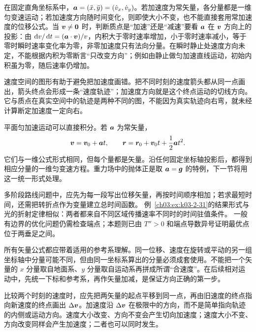 {在固定直角坐标系中，$\bm{a}=(\ddot x,\ddot y)=(\dot v_x,\dot v_y)$。若加速度为常矢量，各分量都是一维匀变速运动；若加速度方向随时间变化，则即使大小不变，也不能直接套用常加速度的位移公式。当 $\bm{v}\ne\bm{0}$ 时，判断质点是“加速”还是“减速”要看 $\bm{a}$ 在 $\bm{v}$ 方向上的投影：由 $\mathop{}\!\mathrm d v/\mathop{}\!\mathrm d t=(\bm{a}\cdot\bm{v})/v$，内积大于零时速率增加，小于零时速率减小，等于零时瞬时速率变化率为零，非零加速度只有法向分量。在瞬时静止处速度方向未定，不能根据内积为零断言“只改变方向”；例如由静止做匀加速直线运动，初始内积虽为零，随后速率仍增加。

速度空间的图形有助于避免把加速度画错。把不同时刻的速度箭头都从同一点画出，箭头终点会形成一条“速度轨迹”；加速度方向就是这个终点运动的切线方向。它与质点在真实空间中的轨迹是两种不同的图，不能因为真实轨迹向右弯，就未经计算断定加速度一定向右。

平面匀加速运动可以直接积分。若 $\bm{a}$ 为常矢量，
\begin{equation}
 \bm{v}=\bm{v}_0+\bm{a}t,
 \qquad
 \bm{r}=\bm{r}_0+\bm{v}_0t+\frac12\bm{a}t^2.
\end{equation}
它们与一维公式形式相同，但每个量都是矢量。沿任何固定坐标轴投影后，都得到相应分量的一维匀变速方程。重力场中的抛体正是取 $\bm{a}=\bm{g}$ 的特例，下一节将用这一统一形式处理。

多阶段路线问题中，应先为每一段写出位移矢量，再按时间顺序相加；若求最短时间，还需把转折点作为变量建立总时间函数。
例~\ref{ch03:ex:k03-2-31}的结果形式与光的折射定律相似：两者都来自不同区域传播速率不同时的时间驻值条件。
一般有边界的优化问题仍需检查端点；本题则已由 $T''>0$ 和端点导数异号证明最优点位于两垂足之间。

所有矢量公式都应带着适用的参考系理解。同一位移、速度在旋转或平动的另一组坐标轴中分量可能不同，但由同一坐标系算出的分量必须成套使用。不能把一个矢量的 $x$ 分量取自地面系、$y$ 分量取自运动系再拼成所谓“合速度”。在后续相对运动中，先统一下标和参考系，再作矢量加减，是保证方向正确的第一步。

比较两个时刻的速度时，应先把两矢量的起点平移到同一点，再由旧速度的终点指向新速度的终点画出 $\Delta\bm{v}$。加速度沿 $\Delta\bm{v}$ 在极限中的方向，而不是简单指向轨迹的内侧或运动方向。速度大小改变、方向不变会产生切向加速度；速度大小不变、方向改变同样会产生加速度；二者也可以同时发生。

\AccelerationVectorDiagram
}

